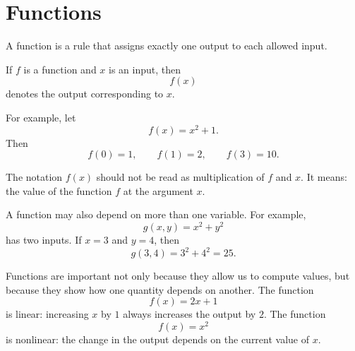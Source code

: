 \section{Functions}

\begin{definitionbox}
A function is a rule that assigns exactly one output to each allowed input.
\end{definitionbox}

If \(f\) is a function and \(x\) is an input, then
\[
f(x)
\]
denotes the output corresponding to \(x\).

For example, let
\[
f(x)=x^2+1.
\]
Then
\[
f(0)=1, \qquad f(1)=2, \qquad f(3)=10.
\]

\begin{remarkbox}
The notation \(f(x)\) should not be read as multiplication of \(f\) and \(x\). It means: the value of the function \(f\) at the argument \(x\).
\end{remarkbox}

A function may also depend on more than one variable. For example,
\[
g(x,y)=x^2+y^2
\]
has two inputs. If \(x=3\) and \(y=4\), then
\[
g(3,4)=3^2+4^2=25.
\]

Functions are important not only because they allow us to compute values, but because they show how one quantity depends on another. The function
\[
f(x)=2x+1
\]
is linear: increasing \(x\) by \(1\) always increases the output by \(2\). The function
\[
f(x)=x^2
\]
is nonlinear: the change in the output depends on the current value of \(x\).
